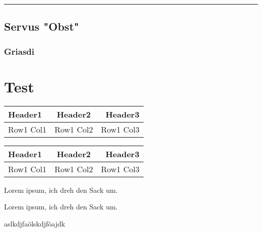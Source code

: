 \vspace{0.4cm}
\hrule
\vspace{0.4cm}

\subsection{Servus "Obst"} 
\subsubsection{Griasdi}

\section{Test}

\begin{table}[h!]
  \centering
  \begin{tabular}{lcr}
    \toprule
    Header1 & Header2 & Header3 \\
    \midrule
    Row1 Col1 & Row1 Col2 & Row1 Col3 \\
    \bottomrule
  \end{tabular}
\end{table}

\begin{table}[h!]
  \centering
  \begin{tabular} {|l|c|r|} 
    \hline
    Header1 & Header2 & Header3 \\
    \hline
    Row1 Col1 & Row1 Col2 & Row1 Col3 \\
    \hline
  \end{tabular}
\end{table}


\begin{tcolorbox}[
  colback=blue!20,
  colframe=blue!60,
  title={Theorem 1},
]
  Lorem ipsum, ich dreh den Sack um.
\end{tcolorbox}

\begin{tcolorbox}[
  colback=green!20,
  colframe=green!40!black,
  title={Title},
]
  Lorem ipsum, ich dreh den Sack um.
\end{tcolorbox}

\begin{tcolorbox}[
  colback=red!20,
  colframe=red!80!black,
  title={Title},
]
  aslkdjfaölskdjföajdk
\end{tcolorbox}

